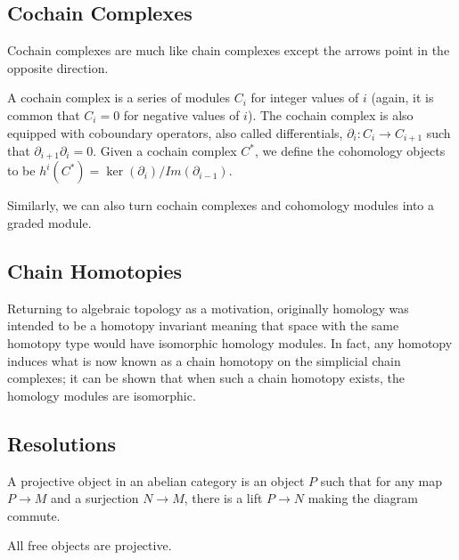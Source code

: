 \subsection{Cochain Complexes}
Cochain complexes are much like chain complexes except the arrows point in the
opposite direction.
\begin{definition} A cochain complex is a series of modules $C_i$ for integer
values of $i$ (again, it is common that $C_i=0$ for negative values of $i$). The
cochain complex is also equipped with coboundary operators, also called
differentials, $\partial_i:C_i\rightarrow C_{i+1}$ such that
$\partial_{i+1}\partial_i=0$. Given a cochain complex $C^*$, we define the
cohomology objects to be $h^i(C^*)=\ker(\partial_i)/Im(\partial_{i-1})$.
\end{definition}
Similarly, we can also turn cochain complexes and cohomology modules into a
graded module.

\subsection{Chain Homotopies}
Returning to algebraic topology as a motivation, originally homology was
intended to be a homotopy invariant meaning that space with the same homotopy
type would have isomorphic homology modules. In fact, any homotopy induces what
is now known as a chain homotopy on the simplicial chain complexes; it can be
shown that when such a chain homotopy exists, the homology modules are
isomorphic.

\subsection{Resolutions}
\begin{definition} A projective object in an abelian category is an object $P$
such that for any map $P\rightarrow M$ and a surjection $N\rightarrow M$, there
is a lift $P\rightarrow N$ making the diagram commute. \end{definition}
\begin{example} All free objects are projective. \end{example}

